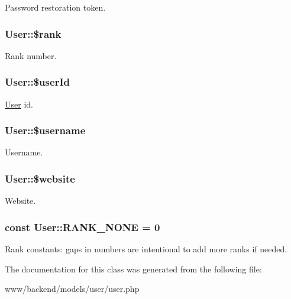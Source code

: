 \label{classUser_a499d31c84301d5ff26c38906c74fab82}
Password restoration token. \hypertarget{classUser_ae9be7cedf59f3dda300308505cfd5948}{
\subsubsection[{\$rank}]{\setlength{\rightskip}{0pt plus 5cm}User::\$rank}}
\label{classUser_ae9be7cedf59f3dda300308505cfd5948}
Rank number. \hypertarget{classUser_abe744027963c3e398da9ad95316ace0d}{
\subsubsection[{\$userId}]{\setlength{\rightskip}{0pt plus 5cm}User::\$userId}}
\label{classUser_abe744027963c3e398da9ad95316ace0d}
\hyperlink{classUser}{User} id. \hypertarget{classUser_ad22e19a56691cba5dc54ac38a91b79ff}{
\subsubsection[{\$username}]{\setlength{\rightskip}{0pt plus 5cm}User::\$username}}
\label{classUser_ad22e19a56691cba5dc54ac38a91b79ff}
Username. \hypertarget{classUser_a9908094d21697133de85c18d68bb94f3}{
\subsubsection[{\$website}]{\setlength{\rightskip}{0pt plus 5cm}User::\$website}}
\label{classUser_a9908094d21697133de85c18d68bb94f3}
Website. \hypertarget{classUser_ad4d2977f50b53b871bf059c570faf6d3}{
\subsubsection[{RANK\_\-NONE}]{\setlength{\rightskip}{0pt plus 5cm}const {\bf User::RANK\_\-NONE} = 0}}
\label{classUser_ad4d2977f50b53b871bf059c570faf6d3}
Rank constants: gaps in numbers are intentional to add more ranks if needed. 

The documentation for this class was generated from the following file:\begin{DoxyCompactItemize}
\item 
www/backend/models/user/user.php\end{DoxyCompactItemize}
